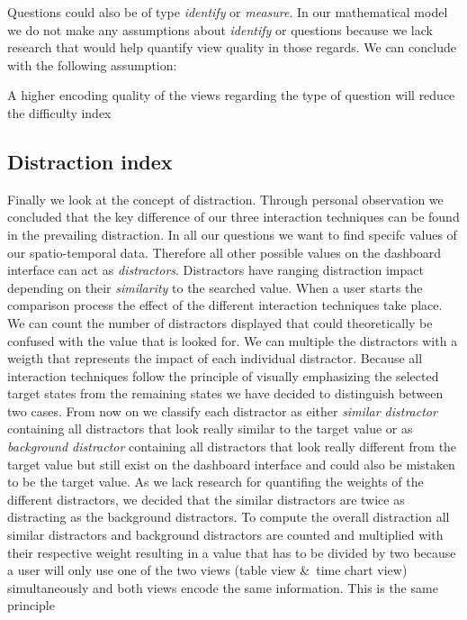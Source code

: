 Questions could also be of type \textit{identify} or \textit{measure}.
In our mathematical model we do not make any assumptions about \textit{identify} or  questions because we lack research that
would help quantify view quality in those regards. We can conclude with the following assumption:
\begin{statements}[resume]
    \item A higher encoding quality of the views regarding the type of question will reduce the difficulty index
\end{statements}
\subsection{Distraction index}
Finally we look at the concept of distraction. Through personal observation we concluded that the key difference of our three interaction
techniques can be found in the prevailing distraction. In all our questions we want to find specifc values of our spatio-temporal data. Therefore
all other possible values on the dashboard interface can act as \textit{distractors}. Distractors have ranging distraction impact depending on
their \textit{similarity} to the searched value. When a user starts the comparison process the effect of the different interaction techniques
take place. We can count the number of distractors displayed that could theoretically be confused with the value that is looked for. We can
multiple the distractors with a weigth that represents the impact of each individual distractor. Because all interaction techniques follow the principle
of visually emphasizing the selected target states from the remaining states we have decided to distinguish between two cases. From now on we classify
each distractor as either \textit{similar distractor} containing all distractors that look really similar to the target value or as
\textit{background distractor} containing all distractors that look really different from the target value but still exist on the dashboard
interface and could also be mistaken to be the target value. As we lack research for quantifing the weights of the different distractors, we
decided that the similar distractors are twice as distracting as the background distractors. To compute the overall distraction all similar distractors
and background distractors are counted and multiplied with their respective weight resulting in a value that has to be divided by two because a user
will only use one of the two views (table view \&\ time chart view) simultaneously and both views encode the same information. This is the same principle
